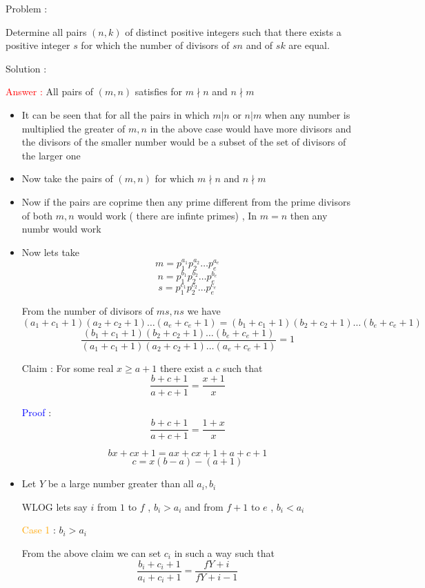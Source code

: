 Problem :

Determine all pairs $(n, k)$ of distinct positive integers such that there exists a positive integer $s$ for which 
the number of divisors of $sn$ and of $sk$ are equal.

Solution :

\textcolor{red}{Answer :} All pairs of $(m,n)$ satisfies for $m \nmid n$ and $n \nmid m$

\begin{itemize}

\item It can be seen that for all the pairs in which $m | n $ or $n | m$  when any number is multiplied the greater of $m,n$ in the above case would have more divisors and the divisors of the smaller number would be a subset of the set of divisors of the larger one

\item Now take the pairs of $(m,n)$
 for which  $m \nmid n$ and $n \nmid m$ 
 
 
 \item Now if the pairs are coprime then any prime different from the prime divisors of both $m,n$ would work ( there are infinte primes)  , In $m=n$ then any numbr would work 
 
 \item Now lets take \[m = p_1^{a_1}p_2^{a_2} \dots p_e^{a_e} \]\[n = p_1^{b_1}p_2^{b_2} \dots p_e^{b_e}\]\[s = p_1^{c_1}p_2^{c_2} \dots p_e^{c_e}\]
 
 From the number of divisors of $ms,ns$ we have \[ (a_1+c_1+1)(a_2+c_2+1) \dots (a_e+c_e+1) = (b_1+c_1+1)(b_2+c_2+1) \dots (b_e+c_e+1) \]
 \[ \frac{(b_1+c_1+1)(b_2+c_2+1) \dots (b_e+c_e+1)}{(a_1+c_1+1)(a_2+c_2+1) \dots (a_e+c_e+1)} = 1 \]
 

 
 Claim : For some real $x \ge a+1$ there exist a $c$ such that \[ \frac{b+c+1}{a+c+1} = \frac{x+1}{x} \]
 
 \textcolor{blue}{Proof } :
 \[ \frac{b+c+1}{a+c+1} = \frac{1+x}{x}\]
  
  \[ bx+cx+1 = ax+cx+1+a+c+1 \] 
   \[ c= x(b-a) -(a+1)\]  
   
   
   \item Let $Y$ be a large number greater than all $a_i,b_i$ 
   
   WLOG lets say $i$ from $1$ to $f$  , $b_i>a_i$ and from $f+1$ to $e$ , $b_i<a_i$
   
   \textcolor{orange}{Case 1} : $b_i>a_i$
   
   From the above claim we can set $c_i$ in such a way such that \[ \frac{b_i+c_i+1}{a_i+c_i+1} = \frac{fY+i}{fY+i-1} \]
   

\end{itemize}
